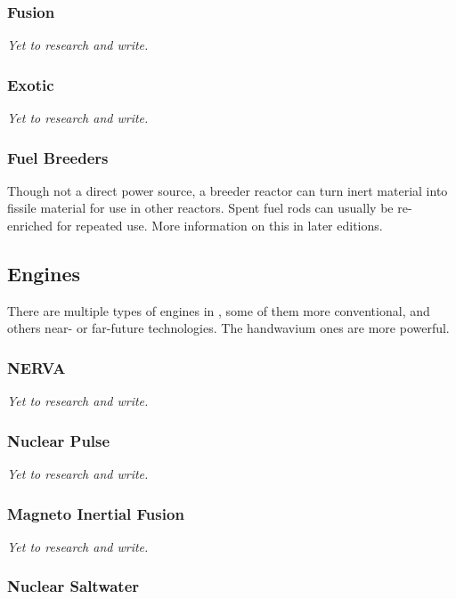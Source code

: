 \subsubsection{Fusion}

\textit{Yet to research and write.}

\subsubsection{Exotic}

\textit{Yet to research and write.}

\subsubsection{Fuel Breeders}

Though not a direct power source, a breeder reactor can turn inert material into fissile material for use in other reactors. Spent fuel rods can usually be re-enriched for repeated use. More information on this in later editions.

\subsection{Engines}

There are multiple types of engines in \getTitle , some of them more conventional, and others near- or far-future technologies. The handwavium ones are more powerful.

\subsubsection{NERVA}

\textit{Yet to research and write.}

\subsubsection{Nuclear Pulse}

\textit{Yet to research and write.}

\subsubsection{Magneto Inertial Fusion}

\textit{Yet to research and write.}

\subsubsection{Nuclear Saltwater}

